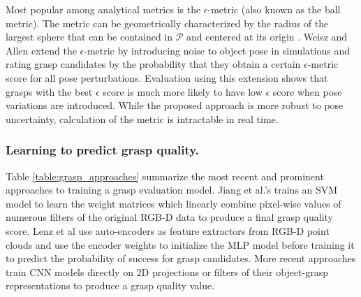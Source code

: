 \documentclass[runningheads]{../llncs}
\begin{document}
Most popular among analytical metrics is the $ \epsilon $-metric (also known as the ball metric). The metric can be
geometrically characterized by the radius of the largest sphere that can be contained in $ \mathcal{P} $ and centered
at its origin \cite{Roa2015}. Weisz and Allen \cite{WeiszAllen2012} extend the $\epsilon$-metric by introducing noise
to object pose in simulations and rating grasp candidates by the probability that they obtain a certain
$ \epsilon $-metric score for all pose perturbations. Evaluation using this extension shows that grasps with the best
$ \epsilon $ score is much more likely to have low $ \epsilon $ score when pose variations are introduced. While the
proposed approach is more robust to pose uncertainty, calculation of the metric is intractable in real time.

\subsubsection*{Learning to predict grasp quality.}

Table \ref{table:grasp_approaches} summarize the most recent and prominent approaches to training a grasp evaluation
model. Jiang et al.'s \cite{jiang2011} trains an SVM model to learn the weight matrices which linearly combine
pixel-wise values of numerous filters of the original RGB-D data to produce a final grasp quality score. Lenz et al
\cite{lenz2015} use auto-encoders as feature extractors from RGB-D point clouds and use the encoder weights to
initialize the MLP model before training it to predict the probability of success for grasp candidates. More recent
approaches \cite{Kappler2015,Gualtieri2016,mahler2017} train CNN models directly on 2D projections or filters of their
object-grasp representations to produce a grasp quality value.
\end{document}
